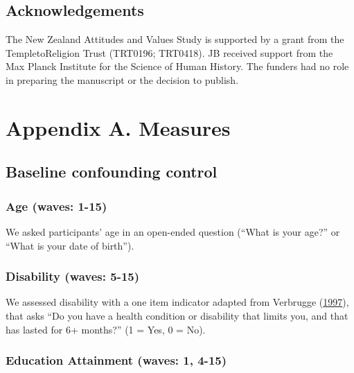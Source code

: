\documentclass[
  singlecolumn]{report}
\begin{document}
\hypertarget{acknowledgements}{%
\subsection{Acknowledgements}\label{acknowledgements}}

The New Zealand Attitudes and Values Study is supported by a grant from
the TempletoReligion Trust (TRT0196; TRT0418). JB received support from
the Max Planck Institute for the Science of Human History. The funders
had no role in preparing the manuscript or the decision to publish.

\newpage{}

\hypertarget{appendix-a.-measures}{%
\section{Appendix A. Measures}\label{appendix-a.-measures}}

\hypertarget{baseline-confounding-control}{%
\subsection{Baseline confounding
control}\label{baseline-confounding-control}}

\hypertarget{age-waves-1-15}{%
\subsubsection{Age (waves: 1-15)}\label{age-waves-1-15}}

We asked participants' age in an open-ended question (``What is your
age?'' or ``What is your date of birth'').

\hypertarget{disability-waves-5-15}{%
\subsubsection{Disability (waves: 5-15)}\label{disability-waves-5-15}}

We assessed disability with a one item indicator adapted from Verbrugge
(\protect\hyperlink{ref-verbrugge1997}{1997}), that asks ``Do you have a
health condition or disability that limits you, and that has lasted for
6+ months?'' (1 = Yes, 0 = No).

\hypertarget{education-attainment-waves-1-4-15}{%
\subsubsection{Education Attainment (waves: 1,
4-15)}\label{education-attainment-waves-1-4-15}}
\end{document}

